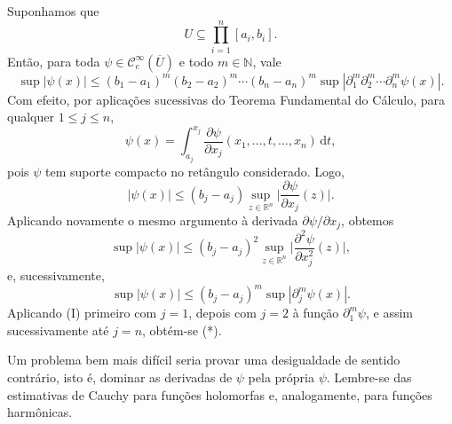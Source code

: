 \documentclass[../distribution_theory_notes.tex]{subfiles}
\begin{document}
Suponhamos que
\[
	U\subseteq \prod_{i=1}^{n}[a_{i},b_{i}].
\]
Então, para toda \(\psi \in \mathcal{C}_{c}^{\infty}(\overline{U})\) e todo \(m\in \mathbb{N}\), vale
\[
	\sup | \psi (x) |
	\leq (b_{1}-a_{1})^{m}(b_{2}-a_{2})^{m}\cdots (b_{n}-a_{n})^{m}
	\sup | \partial_{1}^{m}\partial_{2}^{m}\cdots \partial_{n}^{m}\psi (x) |. \tag{*}
\]
Com efeito, por aplicações sucessivas do Teorema Fundamental do Cálculo, para qualquer \(1\leq j\leq n\),
\[
	\psi (x)=\int_{a_{j}}^{x_{j}}
	\frac{\partial \psi }{\partial x_{j}}(x_{1},\dotsc ,t,\dotsc ,x_{n})\,\mathrm{d}t,
\]
pois \(\psi \) tem suporte compacto no retângulo considerado. Logo,
\[
	| \psi (x) |\leq (b_{j}-a_{j})\sup_{z\in \mathbb{R}^{n}}\biggl| \frac{\partial \psi }{\partial x_{j}}(z)\biggr|.
\]
Aplicando novamente o mesmo argumento à derivada \(\partial \psi /\partial x_{j}\), obtemos
\[
	\sup | \psi (x) |\leq (b_{j}-a_{j})^{2}\sup_{z\in \mathbb{R}^{n}}\biggl| \frac{\partial^{2}\psi }{\partial x_{j}^{2}}(z)\biggr|,
\]
e, sucessivamente,
\[
	\sup | \psi (x) |\leq (b_{j}-a_{j})^{m}\sup | \partial_{j}^{m}\psi (x) |. \tag{I}
\]
Aplicando (I) primeiro com \(j=1\), depois com \(j=2\) à função \(\partial_{1}^{m}\psi \), e assim sucessivamente até \(j=n\), obtém-se (*).

\begin{tcolorbox}[
		skin=enhanced,
		title=Observação,
		fonttitle=\bfseries,
		colframe=black,
		colbacktitle=cyan!75!white,
		colback=cyan!15,
		colbacklower=black,
		coltitle=black,
		drop fuzzy shadow,
	]
	Um problema bem mais difícil seria provar uma desigualdade de sentido contrário, isto é, dominar as derivadas de \(\psi \) pela própria \(\psi \). Lembre-se das estimativas de Cauchy para funções holomorfas e, analogamente, para funções harmônicas.
\end{tcolorbox}
\end{document}
